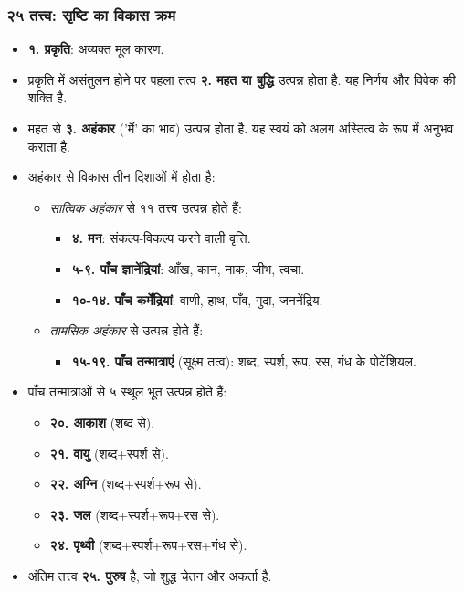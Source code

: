 \begin{frame}[fragile]\frametitle{२५ तत्त्व: सृष्टि का विकास क्रम}
\begin{itemize}
  \item \textbf{१. प्रकृति}: अव्यक्त मूल कारण.
  \item प्रकृति में असंतुलन होने पर पहला तत्व \textbf{२. महत या बुद्धि} उत्पन्न होता है. यह निर्णय और विवेक की शक्ति है.
  \item महत से \textbf{३. अहंकार} ('मैं' का भाव) उत्पन्न होता है. यह स्वयं को अलग अस्तित्व के रूप में अनुभव कराता है.
  \item अहंकार से विकास तीन दिशाओं में होता है:
  \begin{itemize}
    \item \textit{सात्विक अहंकार} से ११ तत्त्व उत्पन्न होते हैं:
      \begin{itemize}
        \item \textbf{४. मन}: संकल्प-विकल्प करने वाली वृत्ति.
        \item \textbf{५-९. पाँच ज्ञानेंद्रियां}: आँख, कान, नाक, जीभ, त्वचा.
        \item \textbf{१०-१४. पाँच कर्मेंद्रियां}: वाणी, हाथ, पाँव, गुदा, जननेंद्रिय.
      \end{itemize}
    \item \textit{तामसिक अहंकार} से उत्पन्न होते हैं:
      \begin{itemize}
        \item \textbf{१५-१९. पाँच तन्मात्राएं} (सूक्ष्म तत्व): शब्द, स्पर्श, रूप, रस, गंध के पोटेंशियल.
      \end{itemize}
  \end{itemize}
   \item पाँच तन्मात्राओं से ५ स्थूल भूत उत्पन्न होते हैं:
   \begin{itemize}
        \item \textbf{२०. आकाश} (शब्द से).
        \item \textbf{२१. वायु} (शब्द+स्पर्श से).
        \item \textbf{२२. अग्नि} (शब्द+स्पर्श+रूप से).
        \item \textbf{२३. जल} (शब्द+स्पर्श+रूप+रस से).
        \item \textbf{२४. पृथ्वी} (शब्द+स्पर्श+रूप+रस+गंध से).
    \end{itemize}
  \item अंतिम तत्त्व \textbf{२५. पुरुष} है, जो शुद्ध चेतन और अकर्ता है.
\end{itemize}
\end{frame}


